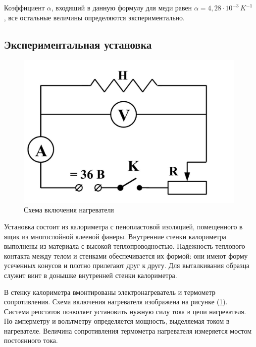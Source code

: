\documentclass[a4paper, 12pt]{article}
\begin{document}
\bigskip

Коэффициент $\alpha$, входящий в данную формулу для меди равен $\alpha = 4,28 \cdot 10^{-3} \, K^{-1}$, все остальные величины определяются экспериментально.

\bigskip

\subsection*{Экспериментальная установка}

\begin{figure}
\vspace{-2.5ex}
	\begin{center}
		\includegraphics[scale=0.07]{img/schem.jpg}
		\caption{Схема включения нагревателя}
		\label{fig:schem_of_facility}
	\end{center}
\end{figure}

Установка состоит из калориметра с пенопластовой изоляцией, помещенного в ящик из многослойной клееной фанеры. Внутренние стенки калориметра выполнены из материала с высокой теплопроводностью. Надежность теплового контакта между телом и стенками обеспечивается их формой: они имеют форму усеченных конусов и плотно прилегают друг к другу. Для выталкивания образца служит винт в донышке внутренней стенки калориметра.

В стенку калориметра вмонтированы электронагреватель и термометр сопротивления. Схема включения нагревателя изображена на рисунке (\ref{fig:schem_of_facility}). Система реостатов позволяет установить нужную силу тока в цепи нагревателя. По амперметру и вольтметру определяется мощность, выделяемая током в нагревателе. Величина сопротивления термометра нагревателя  измеряется мостом постоянного тока.
\end{document}
